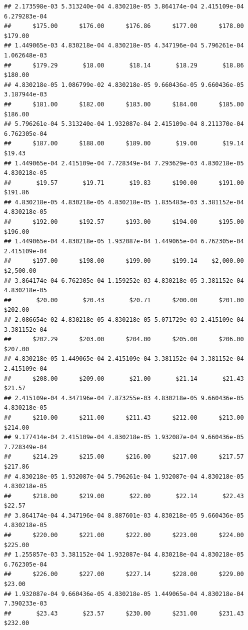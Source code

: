 \begin{verbatim}
## 2.173598e-03 5.313240e-04 4.830218e-05 3.864174e-04 2.415109e-04 6.279283e-04 
##      $175.00      $176.00      $176.86      $177.00      $178.00      $179.00 
## 1.449065e-03 4.830218e-04 4.830218e-05 4.347196e-04 5.796261e-04 1.062648e-03 
##      $179.29       $18.00       $18.14       $18.29       $18.86      $180.00 
## 4.830218e-05 1.086799e-02 4.830218e-05 9.660436e-05 9.660436e-05 3.187944e-03 
##      $181.00      $182.00      $183.00      $184.00      $185.00      $186.00 
## 5.796261e-04 5.313240e-04 1.932087e-04 2.415109e-04 8.211370e-04 6.762305e-04 
##      $187.00      $188.00      $189.00       $19.00       $19.14       $19.43 
## 1.449065e-04 2.415109e-04 7.728349e-04 7.293629e-03 4.830218e-05 4.830218e-05 
##       $19.57       $19.71       $19.83      $190.00      $191.00      $191.86 
## 4.830218e-05 4.830218e-05 4.830218e-05 1.835483e-03 3.381152e-04 4.830218e-05 
##      $192.00      $192.57      $193.00      $194.00      $195.00      $196.00 
## 1.449065e-04 4.830218e-05 1.932087e-04 1.449065e-04 6.762305e-04 2.415109e-04 
##      $197.00      $198.00      $199.00      $199.14    $2,000.00    $2,500.00 
## 3.864174e-04 6.762305e-04 1.159252e-03 4.830218e-05 3.381152e-04 4.830218e-05 
##       $20.00       $20.43       $20.71      $200.00      $201.00      $202.00 
## 2.086654e-02 4.830218e-05 4.830218e-05 5.071729e-03 2.415109e-04 3.381152e-04 
##      $202.29      $203.00      $204.00      $205.00      $206.00      $207.00 
## 4.830218e-05 1.449065e-04 2.415109e-04 3.381152e-04 3.381152e-04 2.415109e-04 
##      $208.00      $209.00       $21.00       $21.14       $21.43       $21.57 
## 2.415109e-04 4.347196e-04 7.873255e-03 4.830218e-05 9.660436e-05 4.830218e-05 
##      $210.00      $211.00      $211.43      $212.00      $213.00      $214.00 
## 9.177414e-04 2.415109e-04 4.830218e-05 1.932087e-04 9.660436e-05 7.728349e-04 
##      $214.29      $215.00      $216.00      $217.00      $217.57      $217.86 
## 4.830218e-05 1.932087e-04 5.796261e-04 1.932087e-04 4.830218e-05 4.830218e-05 
##      $218.00      $219.00       $22.00       $22.14       $22.43       $22.57 
## 3.864174e-04 4.347196e-04 8.887601e-03 4.830218e-05 9.660436e-05 4.830218e-05 
##      $220.00      $221.00      $222.00      $223.00      $224.00      $225.00 
## 1.255857e-03 3.381152e-04 1.932087e-04 4.830218e-04 4.830218e-05 6.762305e-04 
##      $226.00      $227.00      $227.14      $228.00      $229.00       $23.00 
## 1.932087e-04 9.660436e-05 4.830218e-05 1.449065e-04 4.830218e-04 7.390233e-03 
##       $23.43       $23.57      $230.00      $231.00      $231.43      $232.00 

\end{verbatim}
